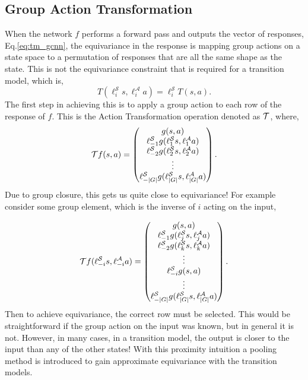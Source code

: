 \subsection{Group Action Transformation}
When the network $f$ performs a forward pass and outputs the vector of responses, Eq.\ref{eq:tm_gcnn}, the equivariance in the response is mapping group actions on a state space to a permutation of responses that are all the same shape as the state. This is not the equivariance constraint that is required for a transition model, which is,
\begin{equation}
	T(\ell_i^\mathcal{S}s, \ell_i^\mathcal{A}a) = \ell_i^\mathcal{S}T(s, a).
\end{equation}
The first step in achieving this is to apply a group action to each row of the response of $f$. This is the Action Transformation operation denoted as $\mathbf{\mathcal{T}}$, where,
\begin{equation}
	\mathbf{\mathcal{T}}f(s,a) = \begin{pmatrix}
		g(s, a)                                                          \\
		\ell_{-1}^\mathcal{S}g(\ell_1^\mathcal{S}s,\ell^\mathcal{A}_1a)  \\
		\ell_{-2}^\mathcal{S}g(\ell^\mathcal{S}_2s, \ell^\mathcal{A}_2a) \\
		\vdots                                                           \\
		\ell_{-|G|}^\mathcal{S}g(\ell_{|G|}^\mathcal{S}s, \ell^\mathcal{A}_{|G|}a)
	\end{pmatrix}.
\end{equation}
Due to group closure, this gets us quite close to equivariance! For example consider some group element, which is the inverse of $i$ acting on the input,

\begin{equation}
	\mathbf{\mathcal{T}}f(\ell_{-i}^\mathcal{S}s,\ell_{-i}^\mathcal{A}a) = \begin{pmatrix}
		g(s, a)                                                          \\
		\ell_{-1}^\mathcal{S}g(\ell_j^\mathcal{S}s,\ell^\mathcal{A}_ja)  \\
		\ell_{-2}^\mathcal{S}g(\ell^\mathcal{S}_ks, \ell^\mathcal{A}_ka) \\
		\vdots                                                           \\
		\ell_{-i}^\mathcal{S}g(s,a)                                      \\
		\vdots                                                           \\
		\ell_{-|G|}^\mathcal{S}g(\ell_{|G|}^\mathcal{S}s, \ell^\mathcal{A}_{|G|}a)
	\end{pmatrix}.
\end{equation}
Then to achieve equivariance, the correct row must be selected. This would be straightforward if the group action on the input was known, but in general it is not. However, in many cases, in a transition model, the output is closer to the input than any of the other states! With this proximity intuition a pooling method is introduced to gain approximate equivariance with the transition models.

